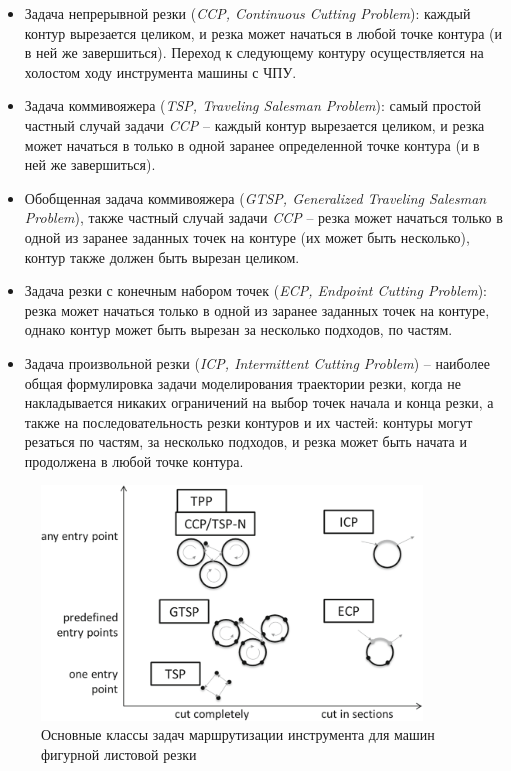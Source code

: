 \documentclass[11pt,twoside,openany]{report}
\newcounter{lem}
\begin{document}
\begin{itemize}
\item Задача непрерывной резки
({\it CCP, Continuous Cutting Problem}):
каждый контур вырезается целиком,
и резка может начаться в любой точке контура (и в ней же завершиться).
Переход к следующему контуру осуществляется на холостом ходу инструмента машины с ЧПУ.

\item Задача коммивояжера
({\it TSP, Traveling Salesman Problem}):
самый простой частный  случай задачи {\it CCP} --
каждый контур вырезается целиком,
и резка может начаться в только в одной заранее определенной точке контура
(и в ней же завершиться).

\item Обобщенная задача коммивояжера
({\it GTSP, Generalized Traveling Salesman Problem}),
также частный случай задачи {\it CCP} --
резка может начаться только в одной из заранее
заданных точек на контуре (их может быть несколько),
контур также должен быть вырезан целиком.

\item Задача резки с конечным набором точек
({\it ECP, Endpoint Cutting Problem}):
резка может начаться только в одной из
заранее заданных точек на контуре,
однако контур может быть вырезан за несколько подходов, по частям.

\item Задача произвольной резки
({\it ICP, Intermittent Cutting Problem})
-- наиболее общая формулировка задачи моделирования траектории резки,
когда не накладывается никаких ограничений на выбор точек начала и конца резки,
а также на последовательность резки контуров и их частей:
контуры могут резаться по частям,
за несколько подходов,
и резка может быть
начата и продолжена в любой точке контура.

\end{itemize}

\begin{figure}[h]
  \begin{center}
  \includegraphics[width=0.9\textwidth]{dewil.png}
  \caption{Основные классы задач маршрутизации инструмента для машин фигурной листовой резки }
  \label{dewil}
  \end{center}
\end{figure}
\end{document}
